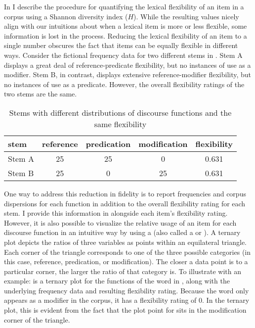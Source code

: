 In  I describe the procedure for quantifying the lexical flexibility of an item in a corpus using a Shannon diversity index ($H$). While the resulting values nicely align with our intuitions about when a lexical item is more or less flexible, some information is lost in the process. Reducing the lexical flexibility of an item to a single number obscures the fact that items can be equally flexible in different ways. Consider the fictional frequency data for two different stems in . Stem A displays a great deal of reference-predicate flexibility, but no instances of use as a modifier. Stem B, in contrast, displays extensive reference-modifier flexibility, but no instances of use as a predicate. However, the overall flexibility ratings of the two stems are the same.

\begin{table}[h!]
  \centering
  \caption{Stems with different distributions of discourse functions and the same flexibility}
  \label{tab:equal-flexibility-stems}
  \begin{tabular}{ l c c c c }
    \toprule
    stem   & reference & predication & modification & flexibility\\
    \midrule
    Stem A & 25        & 25          & 0            & 0.631      \\
    Stem B & 25        & 0           & 25           & 0.631      \\
    \bottomrule
  \end{tabular}
\end{table}

One way to address this reduction in fidelity is to report frequencies and corpus dispersions for each function in addition to the overall flexibility rating for each stem. I provide this information in  alongside each item's flexibility rating. However, it is also possible to visualize the relative usage of an item for each discourse function in an intuitive way by using a  (also called a  or ). A ternary plot depicts the ratios of three variables as points within an equilateral triangle. Each corner of the triangle corresponds to one of the three possible categories (in this case, reference, predication, or modification). The closer a data point is to a particular corner, the larger the ratio of that category is. To illustrate with an example:  is a ternary plot for the functions of the word  in , along with the underlying frequency data and resulting flexibility rating. Because the word  only appears as a modifier in the corpus, it has a flexibility rating of $0$. In the ternary plot, this is evident from the fact that the plot point for  sits in the modification corner of the triangle.

